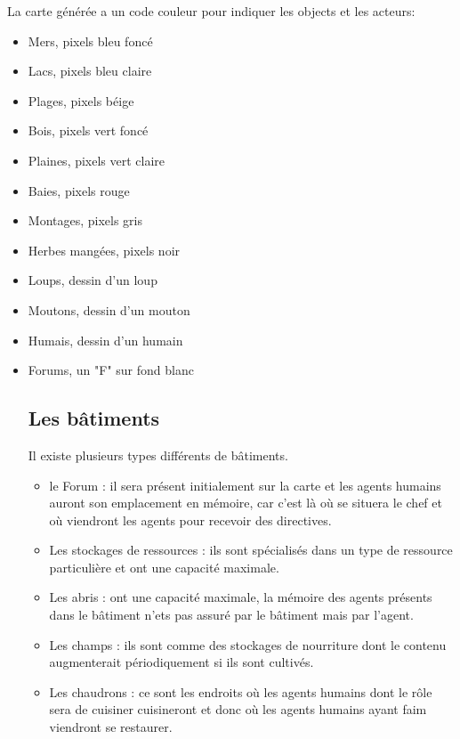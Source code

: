 \documentclass[12pt]{article}
\begin{document}
La carte générée a un code couleur pour indiquer les objects et les acteurs:
	\begin{itemize}
		\item Mers, pixels bleu foncé
		\item Lacs, pixels bleu claire
		\item Plages, pixels béige 
		\item Bois, pixels vert foncé
		\item Plaines, pixels vert claire
		\item Baies, pixels rouge
		\item Montages, pixels gris
		\item Herbes mangées, pixels noir
		\item Loups, dessin d'un loup
		\item Moutons, dessin d'un mouton
		\item Humais, dessin d'un humain
		\item Forums, un "F" sur fond blanc

	\subsection{Les bâtiments}

Il existe plusieurs types différents de bâtiments.
	\begin{itemize}
	
	\item le Forum : il sera présent initialement sur la carte et les 
agents humains auront son emplacement en mémoire, car c'est là où se situera 
le chef et où viendront les agents pour recevoir des directives.

	\item Les stockages de ressources : ils sont spécialisés dans un type 
de ressource particulière et ont une capacité maximale.

	\item Les abris : ont une capacité maximale, la mémoire des agents 
présents dans le bâtiment n'ets pas assuré par le bâtiment mais par l'agent.

	\item Les champs : ils sont comme des stockages de nourriture dont 
le contenu augmenterait périodiquement si ils sont cultivés.

	\item Les chaudrons : ce sont les endroits où les agents humains dont 
le rôle sera de cuisiner cuisineront et donc où les agents humains ayant faim 
viendront se restaurer.


\end{itemize}
\end{itemize}
\end{document}
